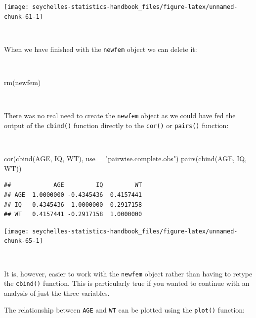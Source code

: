 \documentclass[
  12pt,
]{book}
\newenvironment{Shaded}{\begin{snugshade}}{\end{snugshade}}
\newcommand{\AttributeTok}[1]{\textcolor[rgb]{0.77,0.63,0.00}{#1}}
\newcommand{\FunctionTok}[1]{\textcolor[rgb]{0.00,0.00,0.00}{#1}}
\newcommand{\NormalTok}[1]{#1}
\newcommand{\StringTok}[1]{\textcolor[rgb]{0.31,0.60,0.02}{#1}}
\begin{document}
\newpage

\begin{center}\texttt{[image: seychelles-statistics-handbook\_files/figure-latex/unnamed-chunk-61-1]} \end{center}

~

When we have finished with the \texttt{newfem} object we can delete it:

~

\begin{Shaded}
\begin{Highlighting}[]
\FunctionTok{rm}\NormalTok{(newfem)}
\end{Highlighting}
\end{Shaded}

~

There was no real need to create the \texttt{newfem} object as we could have fed the output of the \texttt{cbind()} function directly to the \texttt{cor()} or \texttt{pairs()} function:

~

\begin{Shaded}
\begin{Highlighting}[]
\FunctionTok{cor}\NormalTok{(}\FunctionTok{cbind}\NormalTok{(AGE, IQ, WT), }\AttributeTok{use =} \StringTok{"pairwise.complete.obs"}\NormalTok{)}
\FunctionTok{pairs}\NormalTok{(}\FunctionTok{cbind}\NormalTok{(AGE, IQ, WT))}
\end{Highlighting}
\end{Shaded}

\begin{verbatim}
##            AGE         IQ         WT
## AGE  1.0000000 -0.4345436  0.4157441
## IQ  -0.4345436  1.0000000 -0.2917158
## WT   0.4157441 -0.2917158  1.0000000
\end{verbatim}

\newpage

\begin{center}\texttt{[image: seychelles-statistics-handbook\_files/figure-latex/unnamed-chunk-65-1]} \end{center}

~

It is, however, easier to work with the \texttt{newfem} object rather than having to retype the \texttt{cbind()} function. This is particularly true if you wanted to continue with an analysis of just the three variables.

The relationship between \texttt{AGE} and \texttt{WT} can be plotted using the \texttt{plot()} function:
\end{document}
